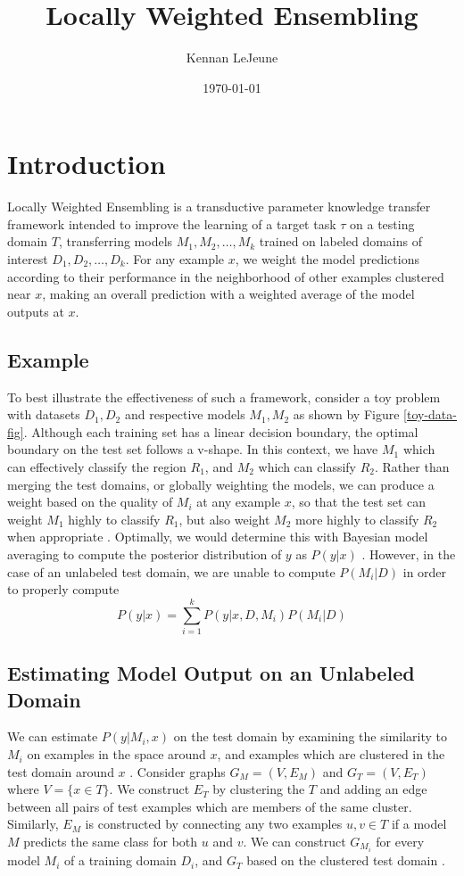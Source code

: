 \documentclass[12pt]{article}
\title{Locally Weighted Ensembling}
\author{Kennan LeJeune}
\date{\today}
\begin{document}
    \maketitle
    \section{Introduction} \label{lwe-intro}
    Locally Weighted Ensembling is a transductive parameter knowledge transfer framework \autocite{pan_yang_2010} intended to improve the learning of a target task $\tau$ on a testing domain $T$, transferring models $M_1, M_2, \ldots, M_k$ trained on labeled domains of interest $D_1, D_2, \ldots, D_k$. For any example $x$, we weight the model predictions according to their performance in the neighborhood of other examples clustered near $x$, making an overall prediction with a weighted average of the model outputs at $x$.

    \subsection{Example}
    To best illustrate the effectiveness of such a framework, consider a toy problem with datasets $D_1, D_2$ and respective models $M_1, M_2$ as shown by Figure \ref{toy-data-fig}. Although each training set has a linear decision boundary, the optimal boundary on the test set follows a v-shape. In this context, we have $M_1$ which can effectively classify the region $R_1$, and $M_2$ which can classify $R_2$. Rather than merging the test domains, or globally weighting the models, we can produce a weight based on the quality of $M_i$ at any example $x$, so that the test set can weight $M_1$ highly to classify $R_1$, but also weight $M_2$ more highly to classify $R_2$ when appropriate \autocite{gao_fan_jiang_han_2008}. Optimally, we would determine this with Bayesian model averaging to compute the posterior distribution of $y$ as $P(y|x)$ \autocite{gao_fan_jiang_han_2008}. However, in the case of an unlabeled test domain, we are unable to compute $P(M_i | D)$ in order to properly compute
    \begin{equation}
      P(y|x) = \sum_{i=1}^{k} P(y|x, D, M_i)P(M_i | D)
    \end{equation}

    \subsection{Estimating Model Output on an Unlabeled Domain} \label{estimating-test-domain}
    We can estimate $P(y|M_i, x)$ on the test domain by examining the similarity to $M_i$ on examples in the space around $x$, and examples which are clustered in the test domain around $x$ \autocite{gao_fan_jiang_han_2008}. Consider graphs $G_M = (V, E_M)$ and $G_T = (V, E_T)$ where $V = \{x \in T\}$. We construct $E_T$ by clustering the $T$ and adding an edge between all pairs of test examples which are members of the same cluster. Similarly, $E_M$ is constructed by connecting any two examples $u, v \in T$ if a model $M$ predicts the same class for both $u$ and $v$. We can construct $G_{M_i}$ for every model $M_i$ of a training domain $D_i$, and $G_T$ based on the clustered test domain \autocite{gao_fan_jiang_han_2008}.
\end{document}
